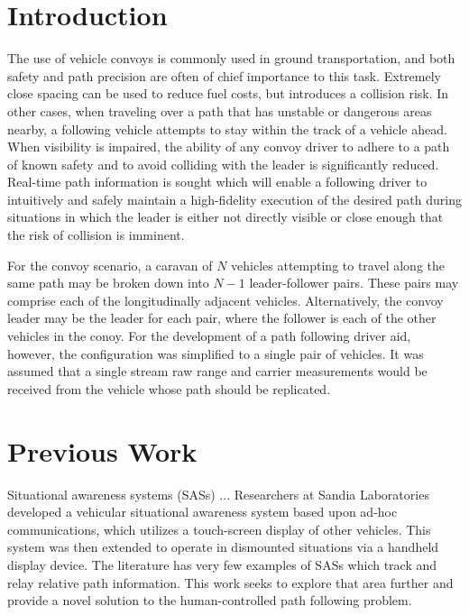 \documentclass[twocolumn,10pt]{article}
\begin{document}

\section*{Introduction}

  The use of vehicle convoys is commonly used in ground transportation, and both safety and path precision are often of chief importance to this task.  Extremely close spacing can be used to reduce fuel costs, but introduces a collision risk.  In other cases, when traveling over a path that has unstable or dangerous areas nearby, a following vehicle attempts to stay within the track of a vehicle ahead.  When visibility is impaired, the ability of any convoy driver to adhere to a path of known safety and to avoid colliding with the leader is significantly reduced.  Real-time path information is sought which will enable a following driver to intuitively and safely maintain a high-fidelity execution of the desired path during situations in which the leader is either not directly visible or close enough that the risk of collision is imminent.

  For the convoy scenario, a caravan of $N$ vehicles attempting to travel along the same path may be broken down into $N-1$ leader-follower pairs.  These pairs may comprise each of the longitudinally adjacent vehicles.  Alternatively, the convoy leader may be the leader for each pair, where the follower is each of the other vehicles in the conoy.  For the development of a path following driver aid, however, the configuration was simplified to a single pair of vehicles.  It was assumed that a single stream raw range and carrier measurements would be received from the vehicle whose path should be replicated.



\section*{Previous Work}

  Situational awareness systems (SASs) ... 
  Researchers at Sandia Laboratories \cite{riblett2007} developed a vehicular situational awareness system based upon ad-hoc communications, which utilizes a touch-screen display of other vehicles. This system was then extended to operate in dismounted situations via a handheld display device.
  The literature has very few examples of SASs which track and relay relative path information. This work seeks to explore that area further and provide a novel solution to the human-controlled path following problem.\
\end{document}
